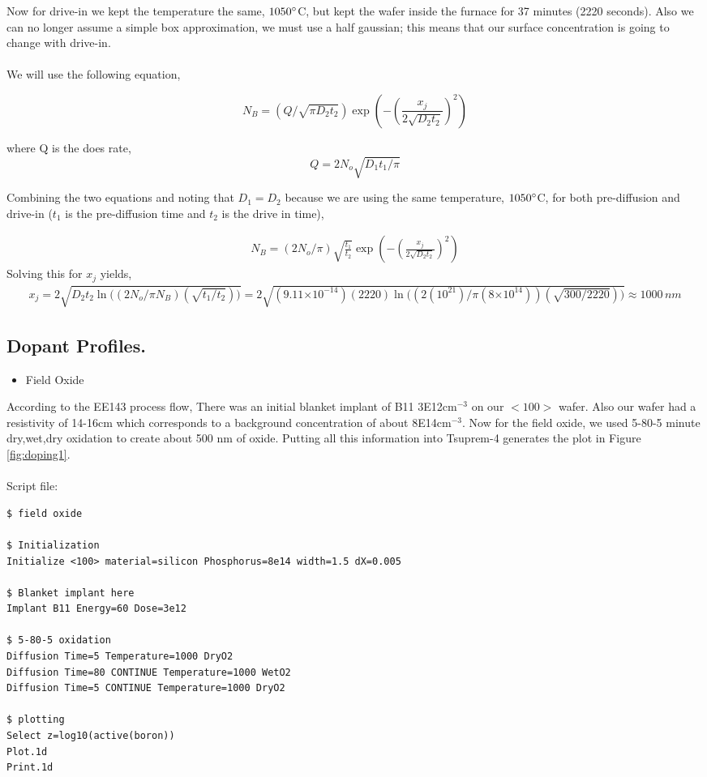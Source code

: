 \documentclass{article}
\providecommand{\e}[1]{\ensuremath{\times 10^{#1}}}
\begin{document}
Now for drive-in we kept the temperature the same, $1050\degree$C, but kept the wafer inside the furnace for 37 minutes (2220 seconds). Also we can no longer assume a simple box approximation, we must use a half gaussian; this means that our surface concentration is going to change with drive-in. \\\\
We will use the following equation,

\begin{equation}
N_B = (Q/\sqrt{\pi D_2t_2})\exp{(-(\frac{x_j}{2\sqrt{D_2t_2}})^2)}
\end{equation}

where Q is the does rate,
\begin{equation}
Q = 2N_o\sqrt{D_1t_1/\pi}
\end{equation}

Combining the two equations and noting that $D_1 = D_2$ because we are using the same temperature, $1050\degree$C, for both pre-diffusion and drive-in ($t_1$ is the pre-diffusion time and $t_2$ is the drive in time),

\begin{align*}
N_B = (2N_o/\pi)\sqrt{\frac{t_1}{t_2}}\exp{(-(\frac{x_j}{2\sqrt{D_2t_2}})^2)}
\end{align*}
Solving this for $x_j$ yields,
\begin{align*}
x_j = 2\sqrt{D_2t_2\ln{\big((2N_o/\pi N_B)(\sqrt{t_1/t_2})\big)}} = 2\sqrt{(9.11\e{-14})(2220)\ln{\big((2(10^{21})/\pi (8\e{14}))(\sqrt{300/2220})\big)}} \approx 1000 \,nm
\end{align*}

\subsection{Dopant Profiles.}
\begin{itemize}
\item Field Oxide
\end{itemize}
According to the EE143 process flow, There was an initial blanket implant of B11 3E12$\text{cm}^{-3}$ on our $<100>$ wafer. Also our wafer had a resistivity of 14-16cm which corresponds to a background concentration of about 8E14$\text{cm}^{-3}$. Now for the field oxide, we used 5-80-5 minute dry,wet,dry oxidation to create about 500 nm of oxide. Putting all this information into Tsuprem-4 generates the plot in Figure \textcolor{blue}{\ref{fig:doping1}}. \\ \\
Script file: 
\begin{verbatim}
$ field oxide

$ Initialization 
Initialize <100> material=silicon Phosphorus=8e14 width=1.5 dX=0.005

$ Blanket implant here
Implant B11 Energy=60 Dose=3e12

$ 5-80-5 oxidation
Diffusion Time=5 Temperature=1000 DryO2
Diffusion Time=80 CONTINUE Temperature=1000 WetO2
Diffusion Time=5 CONTINUE Temperature=1000 DryO2

$ plotting
Select z=log10(active(boron))
Plot.1d
Print.1d
\end{verbatim}
\end{document}
